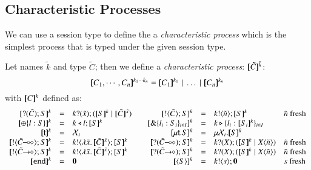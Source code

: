 \subsection{Characteristic Processes}
We can use a session type to define the a {\em characteristic process}
which is the simplest process that is typed
under the given session type.
%
\begin{definition}\rm
	Let names $\tilde{k}$ and type $\tilde{C}$; then we define a {\em characteristic process}:
	$[\!\![\tilde{C}]\!\!]^{\tilde{k}}$:
	\[
		\map{C_1, \cdots, C_n}^{k_1 \cdots k_n} = \map{C_1}^{k_1} \Par \dots \Par \map{C_n}^{k_n}		
	\]
	with $[\!\![C]\!\!]^k$ defined as:
	\[
	\begin{array}{rclcrcll}
		\map{\btinp{\tilde{C}} S}^{k} &=& \binp{k}{\tilde{x}} (\map{S}^{k} \Par \map{\tilde{C}}^{\tilde{x}})
		&&
		\map{\btout{\tilde{C}} S}^{k} &=& \bout{k}{\tilde{n}} \map{S}^{k} & \tilde{n}\textrm{ fresh}
		\\

		\map{\btsel{l : S}}^{k} &=& \bsel{k}{l} \map{S}^{k}
		& &
		\map{\btbra{l_i: S_i}_{i \in I}}^{k} &=& \bbra{k}{l_i: \map{S_i}^{k}}_{i \in I}
		\\

		\map{\tvar{t}}^{k} &=& \rvar{X}_t
		& &
		\map{\trec{t}{S}}^{k} &=& \mu \rvar{X}_t.\map{S}^{k}
		\\

		\map{\btout{\lhot{\tilde{C}}} S}^{k} &=& \bout{k}{\abs{\tilde{x}}{\map{\tilde{C}}^{\tilde{x}}}} \map{S}^k
		& &
		\map{\btinp{\lhot{\tilde{C}}} S}^{k} &=& \binp{k}{X} (\map{S}^k \Par \appl{X}{\tilde{n}}) & \tilde{n}\textrm{ fresh}
		\\

		\map{\btout{\shot{\tilde{C}}} S}^{k} &=& \bout{k}{\abs{\tilde{x}}{\map{\tilde{C}}^{\tilde{x}}}} \map{S}^k
		& &
		\map{\btinp{\shot{\tilde{C}}} S}^{k} &=& \binp{k}{X} (\map{S}^k \Par \appl{X}{\tilde{n}}) & \tilde{n}\textrm{ fresh}
		\\


		\map{\tinact}^{k} &=& \inact
		&&
		\map{\chtype{S}}^{k} &=& \bout{k}{s} \inact &s\textrm{ fresh}%
	\end{array}
	\]
\end{definition}

